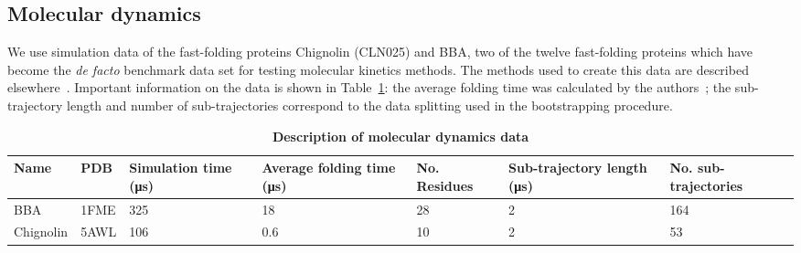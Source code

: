 \documentclass[journal=jacsat,manuscript=article]{achemso}
\begin{document}
\subsection{Molecular dynamics}

We use simulation data of the fast-folding proteins Chignolin (CLN025) and BBA, two of the twelve fast-folding proteins which have become the \textit{de facto} benchmark data set for testing molecular kinetics methods. The methods used to create this data are described elsewhere~\cite{lindorff-larsen_how_2011}. Important information on the data is shown in Table~\ref{tab:data_description}: the average folding time was calculated by the authors~\cite{lindorff-larsen_how_2011}; the sub-trajectory length and number of sub-trajectories correspond to the data splitting used in the bootstrapping procedure. 

\begin{table}
    \caption{\textbf{Description of molecular dynamics data}}
    \begin{tabularx}{\textwidth}{llXXXXX}
    \toprule
    Name & PDB & Simulation time (\si{\micro\second}) & Average folding time (\si{\micro\second}) & No. Residues & Sub-trajectory length (\si{\micro\second}) & No. sub-trajectories \\
    \midrule
    BBA                 & 1FME      & \num{325}     & \num{18}  & 28 & \num{2} & 164 \\
    Chignolin           & 5AWL    & \num{106}     & \num{0.6}  & 10 & 2 & 53 \\ 
    \bottomrule
    \end{tabularx}
    \label{tab:data_description}
\end{table}
\end{document}
